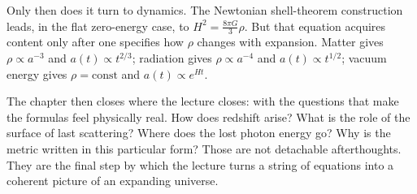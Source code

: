 Only then does it turn to dynamics. The Newtonian shell-theorem construction leads, in the flat zero-energy case, to
\(H^2=\frac{8\pi G}{3}\rho\).
But that equation acquires content only after one specifies how \(\rho\) changes with expansion. Matter gives \(\rho\propto a^{-3}\) and \(a(t)\propto t^{2/3}\); radiation gives \(\rho\propto a^{-4}\) and \(a(t)\propto t^{1/2}\); vacuum energy gives \(\rho=\text{const}\) and \(a(t)\propto e^{Ht}\).

The chapter then closes where the lecture closes: with the questions that make the formulas feel physically real. How does redshift arise? What is the role of the surface of last scattering? Where does the lost photon energy go? Why is the metric written in this particular form? Those are not detachable afterthoughts. They are the final step by which the lecture turns a string of equations into a coherent picture of an expanding universe.